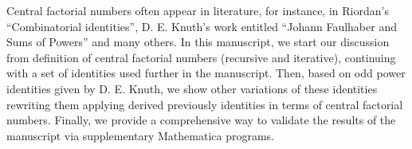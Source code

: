 Central factorial numbers often appear in literature, for instance, in Riordan's ``Combinatorial identities'',
D. E. Knuth's work entitled ``Johann Faulhaber and Sums of Powers'' and many others.
In this manuscript, we start our discussion from definition of central factorial numbers (recursive and iterative),
continuing with a set of identities used further in the manuscript.
Then, based on odd power identities given by D. E. Knuth,
we show other variations of these identities
rewriting them applying derived previously identities in terms of central factorial numbers.
Finally,
we provide a comprehensive way to validate the results of the manuscript via supplementary Mathematica programs.